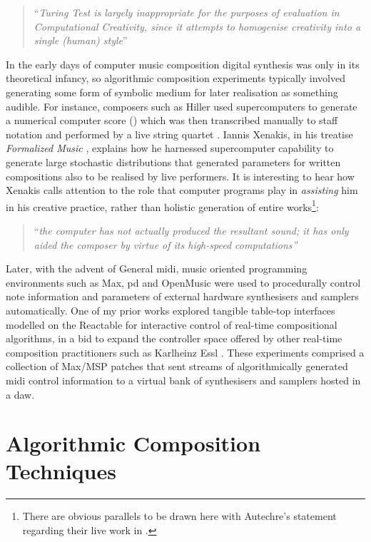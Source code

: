 \blockcquote[]{Pease2011}{``\textit{Turing Test is largely inappropriate for the purposes of evaluation in Computational Creativity, since it attempts to homogenise creativity into a single (human) style}''}

In the early days of computer music composition digital synthesis was only in its theoretical infancy, so algorithmic composition experiments typically involved generating some form of symbolic medium for later realisation as something audible. For instance, composers such as Hiller used supercomputers to generate a numerical computer score () which was then transcribed manually to staff notation and performed by a live string quartet \citep{Hiller1979}. Iannis Xenakis, in his treatise \textit{Formalized Music} \citep{Bradshaw1973}, explains how he harnessed supercomputer capability to generate large stochastic distributions that generated parameters for written compositions also to be realised by live performers. It is interesting to hear  how Xenakis calls attention to the role that computer programs play in \textit{assisting} him in his creative practice, rather than holistic generation of entire works\footnote{There are obvious parallels to be drawn here with Autechre's statement regarding their live work in .}:

\blockcquote[]{Cope2000}{``\textit{the computer has not actually produced the resultant sound; it has only aided the composer by virtue of its high-speed computations''}}

Later, with the advent of General \acrshort{midi}, music oriented programming environments such as Max, \acrshort{pd} and OpenMusic were used to procedurally control note information and parameters of external hardware synthesisers and samplers automatically. One of my prior works \citep{Nuanain2014} explored tangible table-top interfaces modelled on the Reactable \citep{Jorda2005} for interactive control of real-time compositional algorithms, in a bid to expand the controller space offered by other real-time composition practitioners such as Karlheinz Essl \citep{Essl2014}. These experiments comprised a collection of Max/MSP patches that sent streams of algorithmically generated \acrshort{midi} control information to a virtual bank of synthesisers and samplers hosted in a \acrshort{daw}.

\section{Algorithmic Composition Techniques}

